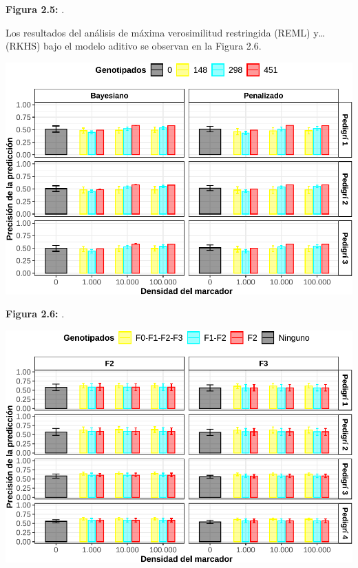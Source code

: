 \documentclass[11pt,spanish,a4paper,oneside,]{book} %
\begin{document}
\begin{center}
\textbf{Figura 2.5:} .

\end{center}

Los resultados del análisis de máxima verosimilitud restringida (REML) y\ldots{} (RKHS) bajo el modelo aditivo se observan en la Figura 2.6.

\begin{center}\includegraphics[width=1\linewidth]{figures/Cor_Bay_Pen} \end{center}

\begin{center}
\textbf{Figura 2.6:} .

\end{center}

\begin{center}\includegraphics[width=1\linewidth]{figures/Cor_F2_F3} \end{center}
\end{document}
